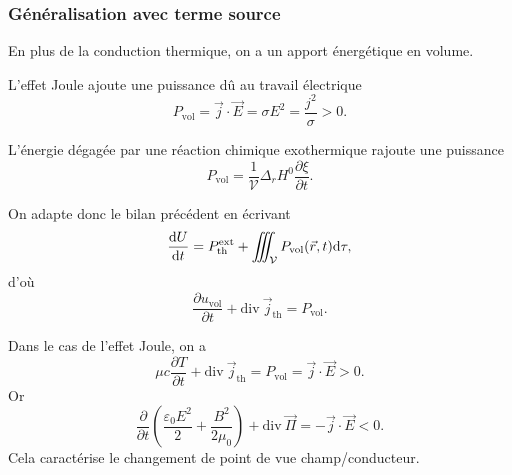         \subsubsection{Généralisation avec terme source}

            En plus de la conduction thermique, on a un apport énergétique en volume.

            \begin{example}
                L'effet Joule ajoute une puissance dû au travail électrique
                \begin{equation}
                    P_{\text{vol}}=\vec{j}\cdot\vec{E}=\sigma E^{2}=\frac{j^{2}}{\sigma}>0.
                \end{equation}
            \end{example}
            \begin{example}
                L'énergie dégagée par une réaction chimique exothermique rajoute une puissance
                \begin{equation}
                    P_{\text{vol}}=\frac{1}{\mathcal{V}}\Delta_r H^{0}\frac{\partial\xi}{\partial t}.
                \end{equation}
            \end{example}

            On adapte donc le bilan précédent en écrivant
            \begin{equation}
                \frac{\mathrm{d} U}{\mathrm{d} t}=P_{\text{th}}^{\text{ext}}+\iiint_{\mathcal{V}}P_{\text{vol}}(\vec{r},t)\mathrm{d}\tau,
            \end{equation}
            d'où
            \begin{equation}
                \boxed{
                    \frac{\partial u_{\text{vol}}}{\partial t}+\mathrm{div}~\vec{j}_{\text{th}}=P_{\text{vol}}.
                }
            \end{equation}

            \begin{example}
                Dans le cas de l'effet Joule, on a 
                \begin{equation}
                    \mu c\frac{\partial T}{\partial t}+\mathrm{div}~\vec{j}_{\text{th}}=P_{\text{vol}}=\vec{j}\cdot\vec{E}>0.
                \end{equation}
                Or 
                \begin{equation}
                    \frac{\partial}{\partial t}\left(\frac{\varepsilon_{0}E^{2}}{2}+\frac{B^{2}}{2\mu_0}\right)+\mathrm{div}~\vec{\Pi}=-\vec{j}\cdot\vec{E}<0.
                \end{equation}
                Cela caractérise le changement de point de vue champ/conducteur.
            \end{example}

